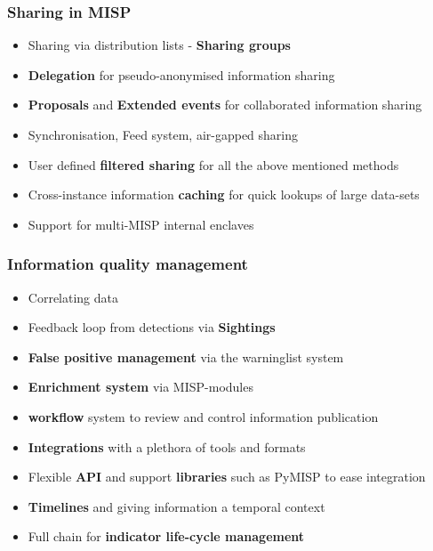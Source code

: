 \begin{frame}
\frametitle{Sharing in MISP}
    \begin{itemize}
        \item Sharing via distribution lists - {\bf Sharing groups}
        \item {\bf Delegation} for pseudo-anonymised information sharing
        \item {\bf Proposals} and {\bf Extended events} for collaborated information sharing
        \item Synchronisation, Feed system, air-gapped sharing
        \item User defined {\bf filtered sharing} for all the above mentioned methods
        \item Cross-instance information {\bf caching} for quick lookups of large data-sets
        \item Support for multi-MISP internal enclaves
    \end{itemize}
\end{frame}


\begin{frame}
\frametitle{Information quality management}
    \begin{itemize}
        \item Correlating data
        \item Feedback loop from detections via {\bf Sightings}
        \item {\bf False positive management} via the warninglist system
        \item {\bf Enrichment system} via MISP-modules
        \item {\bf workflow} system to review and control information publication
        \item {\bf Integrations} with a plethora of tools and formats
        \item Flexible {\bf API} and support {\bf libraries} such as PyMISP to ease integration
        \item {\bf Timelines} and giving information a temporal context
        \item Full chain for {\bf indicator life-cycle management}
    \end{itemize}
\end{frame}

